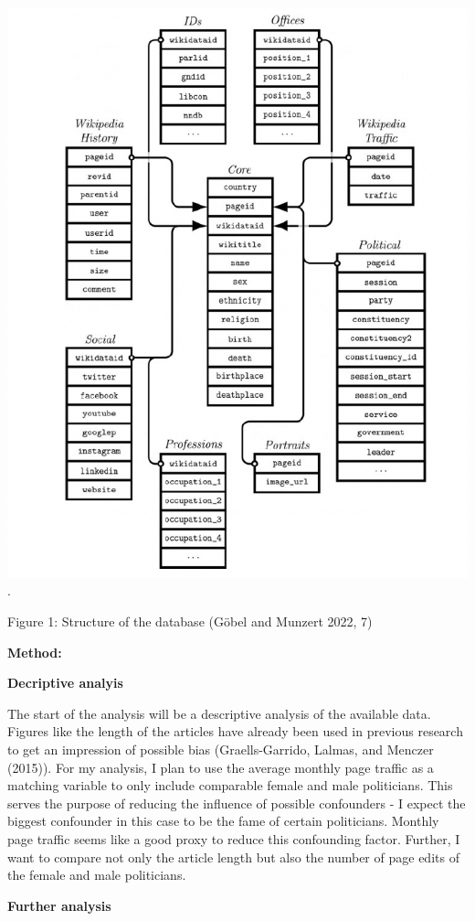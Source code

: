 \documentclass[
]{article}
\begin{document}
\includegraphics{Overview_cld.png}.

Figure 1: Structure of the database (Göbel and Munzert 2022, 7)

\textbf{Method:}

\textbf{Decriptive analyis}

The start of the analysis will be a descriptive analysis of the
available data. Figures like the length of the articles have already
been used in previous research to get an impression of possible bias
(Graells-Garrido, Lalmas, and Menczer (2015)). For my analysis, I plan
to use the average monthly page traffic as a matching variable to only
include comparable female and male politicians. This serves the purpose
of reducing the influence of possible confounders - I expect the biggest
confounder in this case to be the fame of certain politicians. Monthly
page traffic seems like a good proxy to reduce this confounding factor.
Further, I want to compare not only the article length but also the
number of page edits of the female and male politicians.

\textbf{Further analysis}
\end{document}
